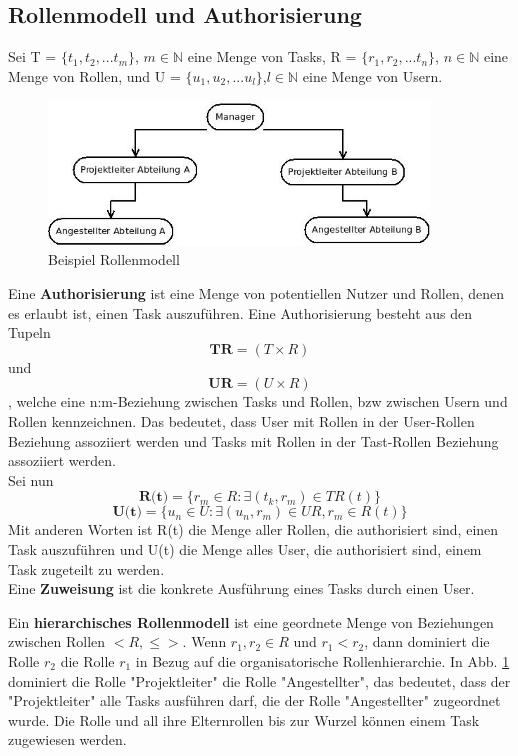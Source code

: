 \subsection{Rollenmodell und Authorisierung}
Sei T = $\{t_1,t_2,...t_m\}$, $m\in\mathbb{N}$ eine Menge von Tasks, R = $\{r_1,r_2,...t_n\}$, $n\in\mathbb{N}$ eine Menge von Rollen, und U = $\{u_1,u_2,...u_l\}$,$l\in\mathbb{N}$ eine Menge von Usern.

\begin{figure}[ht]
	\centering
  \includegraphics[width=0.9\textwidth]{Figures/Rollenmodell}
	\caption{Beispiel Rollenmodell}
	\label{fig:examplerolemodel}
\end{figure}

Eine \textbf{Authorisierung} ist eine Menge von potentiellen Nutzer und Rollen, denen es erlaubt ist, einen Task auszuführen. Eine Authorisierung besteht aus den Tupeln $$\textbf{TR} = (T\times R)$$ und $$\textbf{UR} = (U\times R)$$, welche eine n:m-Beziehung zwischen Tasks und Rollen, bzw zwischen Usern und Rollen kennzeichnen. Das bedeutet, dass User mit Rollen in der User-Rollen Beziehung assoziiert werden und Tasks mit Rollen in der Tast-Rollen Beziehung assoziiert werden.\\
Sei nun $$\textbf{R(t)} = \{r_m \in R: \exists(t_k, r_m) \in TR(t)\}$$
$$\textbf{U(t)} = \{u_n \in U: \exists(u_n, r_m) \in UR, r_m \in R(t)\}$$
Mit anderen Worten ist R(t) die Menge aller Rollen, die authorisiert sind, einen Task auszuführen und U(t) die Menge alles User, die authorisiert sind, einem Task zugeteilt zu werden.\\
Eine \textbf{Zuweisung} ist die konkrete Ausführung eines Tasks durch einen User.

Ein \textbf{hierarchisches Rollenmodell} ist eine geordnete Menge von Beziehungen zwischen Rollen $<R, \leq>$. Wenn $r_1, r_2 \in R$ und $r_1 < r_2$, dann dominiert die Rolle $r_2$ die Rolle $r_1$ in Bezug auf die organisatorische Rollenhierarchie. In Abb. \ref{fig:examplerolemodel} dominiert die Rolle "Projektleiter" die Rolle "Angestellter", das bedeutet, dass der "Projektleiter" alle Tasks ausführen darf, die der Rolle "Angestellter" zugeordnet wurde.
Die Rolle und all ihre Elternrollen bis zur Wurzel können einem Task zugewiesen werden.

